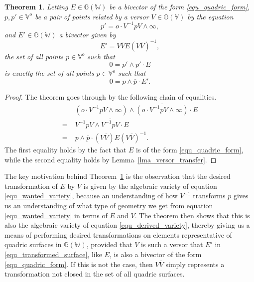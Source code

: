 \documentclass{birkjour}
\newtheorem{thm}{Theorem}[section]
\theoremstyle{definition}
\theoremstyle{remark}
\numberwithin{equation}{section}
\newcommand{\G}{\mathbb{G}}
\newcommand{\V}{\mathbb{V}}
\newcommand{\W}{\mathbb{W}}
\newcommand{\nvao}{o}
\newcommand{\nvai}{\infty}
\begin{document}
\begin{thm}\label{thm_quadric_transform}
Letting $E\in\G(\W)$ be a bivector of the form \eqref{equ_quadric_form},
$p,p'\in\V^o$ be a pair of points related by a versor $V\in\G(\V)$ by
the equation
\begin{equation}\label{equ_get_rid_ni}
p' = \nvao\cdot V^{-1}pV\wedge\nvai,
\end{equation}
and $E'\in\G(\W)$ a bivector given by
\begin{equation}\label{equ_transformed_surface}
E' = V\overline{V}E(V\overline{V})^{-1},
\end{equation}
the set of all points $p\in\V^\nvao$ such that
\begin{equation}\label{equ_wanted_variety}
0 = p'\wedge\overline{p}'\cdot E
\end{equation}
is exactly the set of all points $p\in\V^\nvao$ such that
\begin{equation}\label{equ_derived_variety}
0 = p\wedge\overline{p}\cdot E'.
\end{equation}
\end{thm}
\begin{proof}
The theorem goes through by the following chain of equalities.
\begin{align}
 & (\nvao\cdot V^{-1}pV\wedge\nvai)\wedge\overline{(\nvao\cdot V^{-1}pV\wedge\nvai)}\cdot E \\
=\;& V^{-1}pV\wedge\overline{V^{-1}pV}\cdot E \\
=\;& p\wedge\overline{p}\cdot(V\overline{V})E(V\overline{V})^{-1}.
\end{align}
The first equality holds by the fact that $E$ is of the form \eqref{equ_quadric_form},
while the second equality holds by Lemma~\ref{lma_versor_transfer}.
\end{proof}

The key motivation behind Theorem~\ref{thm_quadric_transform} is
the observation that the desired transformation of $E$ by $V$ is
given by the algebraic variety of equation \eqref{equ_wanted_variety}, because
an understanding of how $V^{-1}$ transforms $p$ gives us an understanding
of what type of geometry we get from equation \eqref{equ_wanted_variety} in terms of $E$ and $V$.
The theorem then
shows that this is also the algebraic variety of equation \eqref{equ_derived_variety}, thereby
giving us a means of performing desired transformations on elements representative
of quadric surfaces in $\G(\W)$, provided that $V$ is such a versor that $E'$ in
\eqref{equ_transformed_surface}, like $E$, is also a bivector of the form \eqref{equ_quadric_form}.
If this is not the case, then $V\overline{V}$ simply represents a transformation not
closed in the set of all quadric surfaces.
\end{document}
